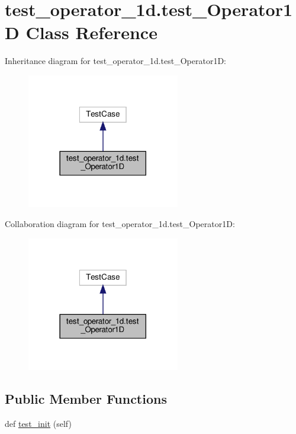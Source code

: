 \hypertarget{classtest__operator__1d_1_1test__Operator1D}{}\section{test\+\_\+operator\+\_\+1d.\+test\+\_\+\+Operator1D Class Reference}
\label{classtest__operator__1d_1_1test__Operator1D}


Inheritance diagram for test\+\_\+operator\+\_\+1d.\+test\+\_\+\+Operator1D\+:
\nopagebreak
\begin{figure}[H]
\begin{center}
\leavevmode
\includegraphics[width=189pt]{classtest__operator__1d_1_1test__Operator1D__inherit__graph}
\end{center}
\end{figure}


Collaboration diagram for test\+\_\+operator\+\_\+1d.\+test\+\_\+\+Operator1D\+:
\nopagebreak
\begin{figure}[H]
\begin{center}
\leavevmode
\includegraphics[width=189pt]{classtest__operator__1d_1_1test__Operator1D__coll__graph}
\end{center}
\end{figure}
\subsection*{Public Member Functions}
\begin{DoxyCompactItemize}
\item 
def \hyperlink{classtest__operator__1d_1_1test__Operator1D_a34c6a728801de7f2ca62ae5290f9e760}{test\+\_\+init} (self)
\end{DoxyCompactItemize}


